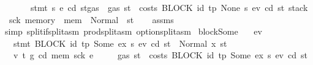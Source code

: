 \begin{isabellebody}
\ \ \ \ \ \ \ {\isachardoublequoteopen}stmt\ s\ e{\isacharprime}{\kern0pt}\ cd{\isacharprime}{\kern0pt}\ {\isacharparenleft}{\kern0pt}st{\isasymlparr}gas\ {\isacharcolon}{\kern0pt}{\isacharequal}{\kern0pt}\ gas\ st\ {\isacharminus}{\kern0pt}\ costs\ {\isacharparenleft}{\kern0pt}BLOCK\ {\isacharparenleft}{\kern0pt}{\isacharparenleft}{\kern0pt}id{}{\isacharcomma}{\kern0pt}\ tp{\isacharparenright}{\kern0pt}{\isacharcomma}{\kern0pt}\ None{\isacharparenright}{\kern0pt}\ s{\isacharparenright}{\kern0pt}\ ev\ cd\ st{\isacharcomma}{\kern0pt}\ stack\ {\isacharcolon}{\kern0pt}{\isacharequal}{\kern0pt}\ sck{\isacharprime}{\kern0pt}{\isacharcomma}{\kern0pt}\ memory\ {\isacharcolon}{\kern0pt}{\isacharequal}{\kern0pt}\ mem{\isacharprime}{\kern0pt}{\isasymrparr}{\isacharparenright}{\kern0pt}\ {\isacharequal}{\kern0pt}\ Normal\ {\isacharparenleft}{\kern0pt}{\isacharparenleft}{\kern0pt}{\isacharparenright}{\kern0pt}{\isacharcomma}{\kern0pt}\ st{\isacharprime}{\kern0pt}{\isacharparenright}{\kern0pt}{\isachardoublequoteclose}\isanewline
%
\isadelimproof
\ \ %
\endisadelimproof
%
\isatagproof
{}\isamarkupfalse%
\ assms\ \isamarkupfalse%
\ {\isacharparenleft}{\kern0pt}simp\ split{\isacharcolon}{\kern0pt}if{\isacharunderscore}{\kern0pt}split{\isacharunderscore}{\kern0pt}asm\ prod{\isachardot}{\kern0pt}split{\isacharunderscore}{\kern0pt}asm\ option{\isachardot}{\kern0pt}split{\isacharunderscore}{\kern0pt}asm{\isacharparenright}{\kern0pt}%
\endisatagproof
{\isafoldproof}%
%
\isadelimproof
\isanewline
%
\endisadelimproof
\isanewline
{}\isamarkupfalse%
\ blockSome{\isacharcolon}{\kern0pt}\isanewline
\ \ \ ev\isanewline
\ \ \ {\isachardoublequoteopen}stmt\ {\isacharparenleft}{\kern0pt}BLOCK\ {\isacharparenleft}{\kern0pt}{\isacharparenleft}{\kern0pt}id{}{\isacharcomma}{\kern0pt}\ tp{\isacharparenright}{\kern0pt}{\isacharcomma}{\kern0pt}\ Some\ ex{\isacharprime}{\kern0pt}{\isacharparenright}{\kern0pt}\ s{\isacharparenright}{\kern0pt}\ ev\ cd\ st\ {\isacharequal}{\kern0pt}\ Normal\ {\isacharparenleft}{\kern0pt}x{\isacharcomma}{\kern0pt}\ st{\isacharprime}{\kern0pt}{\isacharparenright}{\kern0pt}{\isachardoublequoteclose}\isanewline
\ \ \ v\ t\ g\ cd{\isacharprime}{\kern0pt}\ mem{\isacharprime}{\kern0pt}\ sck{\isacharprime}{\kern0pt}\ e{\isacharprime}{\kern0pt}\isanewline
\ \ \ \ \ {\isachardoublequoteopen}gas\ st\ {\isachargreater}{\kern0pt}\ costs\ {\isacharparenleft}{\kern0pt}BLOCK\ {\isacharparenleft}{\kern0pt}{\isacharparenleft}{\kern0pt}id{}{\isacharcomma}{\kern0pt}\ tp{\isacharparenright}{\kern0pt}{\isacharcomma}{\kern0pt}\ Some\ ex{\isacharprime}{\kern0pt}{\isacharparenright}{\kern0pt}\ s{\isacharparenright}{\kern0pt}\ ev\ cd\ st{\isachardoublequoteclose}\isanewline

\end{isabellebody}
